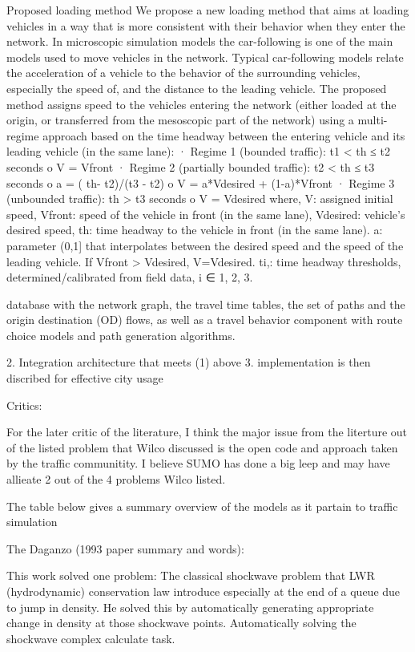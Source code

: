 \begin{bibunit}[plainnat]
Proposed loading method
We propose a new loading method that aims at loading vehicles in a way that is more consistent with
their behavior when they enter the network. In microscopic simulation models the car-following is
one of the main models used to move vehicles in the network. Typical car-following models relate the
acceleration of a vehicle to the behavior of the surrounding vehicles, especially the speed of, and the
distance to the leading vehicle. The proposed method assigns speed to the vehicles entering the
network (either loaded at the origin, or transferred from the mesoscopic part of the network) using a
multi-regime approach based on the time headway between the entering vehicle and its leading vehicle
(in the same lane):
· Regime 1 (bounded traffic): t1 < th ≤ t2 seconds
o V = Vfront
· Regime 2 (partially bounded traffic): t2 < th ≤ t3 seconds
o a = ( th- t2)/(t3 - t2)
o V = a*Vdesired + (1-a)*Vfront
· Regime 3 (unbounded traffic): th > t3 seconds
o V = Vdesired
where,
V: assigned initial speed,
Vfront: speed of the vehicle in front (in the same lane),
Vdesired: vehicle’s desired speed,
th: time headway to the vehicle in front (in the same lane).
a: parameter (0,1] that interpolates between the desired speed and the speed of the leading
vehicle. If Vfront > Vdesired, V=Vdesired.
ti,: time headway thresholds, determined/calibrated from field data, i ∈ {1, 2, 3}.




database with the network graph, the travel time tables, the set of paths and the origin
destination (OD) flows, as well as a travel behavior component with route choice models and path generation
algorithms.


2. Integration architecture that meets (1) above
3. implementation is then discribed for effective city usage




Critics:

For the later critic of the literature, I think the major issue from the literture out of the 
listed problem that Wilco discussed is the open code and approach  taken by
the traffic communitity. 
I believe SUMO has done a big leep and may have allieate 2 out of the 4 problems Wilco listed. 

The table below gives a summary overview of the models as it partain to traffic simulation 



The Daganzo (1993 paper summary and words):

This work solved one problem: The classical shockwave problem that LWR (hydrodynamic) conservation law 
introduce especially at the end of a queue due to jump in density. He solved this 
by automatically generating appropriate change in density at those shockwave points. Automatically solving the 
shockwave complex calculate task. 


\end{bibunit}
